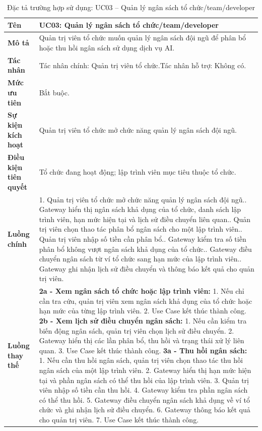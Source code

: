 \begin{longtable}{|L{4.2cm}|L{9.5cm}|}
\caption[Đặc tả UC03]{Đặc tả trường hợp sử dụng: UC03 -- Quản lý ngân sách tổ chức/team/developer} \\\hline
\textbf{Tên} & UC03: Quản lý ngân sách tổ chức/team/developer \\\hline
\textbf{Mô tả} & Quản trị viên tổ chức muốn quản lý ngân sách đội ngũ để phân bổ hoặc thu hồi ngân sách sử dụng dịch vụ AI.\\\hline
\textbf{Tác nhân} & Tác nhân chính: Quản trị viên tổ chức.\newline Tác nhân hỗ trợ: Không có.\\\hline
\textbf{Mức ưu tiên} & Bắt buộc.\\\hline
\textbf{Sự kiện kích hoạt} & Quản trị viên tổ chức mở chức năng quản lý ngân sách đội ngũ.\\\hline
\textbf{Điều kiện tiên quyết} & Tổ chức đang hoạt động; lập trình viên mục tiêu thuộc tổ chức.\\\hline
\textbf{Luồng chính} &
1. Quản trị viên tổ chức mở chức năng quản lý ngân sách đội ngũ.. Gateway hiển thị ngân sách khả dụng của tổ chức, danh sách lập trình viên, hạn mức hiện tại và lịch sử điều chuyển liên quan.. Quản trị viên chọn thao tác phân bổ ngân sách cho một lập trình viên.. Quản trị viên nhập số tiền cần phân bổ.. Gateway kiểm tra số tiền phân bổ không vượt ngân sách khả dụng của tổ chức.. Gateway điều chuyển ngân sách từ ví tổ chức sang hạn mức của lập trình viên.. Gateway ghi nhận lịch sử điều chuyển và thông báo kết quả cho quản trị viên.\\\hline
\textbf{Luồng thay thế} &
\textbf{2a - Xem ngân sách tổ chức hoặc lập trình viên:} 1. Nếu chỉ cần tra cứu, quản trị viên xem ngân sách khả dụng của tổ chức hoặc hạn mức của từng lập trình viên. 2. Use Case kết thúc thành công.\newline
\textbf{2b - Xem lịch sử điều chuyển ngân sách:} 1. Nếu cần kiểm tra biến động ngân sách, quản trị viên chọn lịch sử điều chuyển. 2. Gateway hiển thị các lần phân bổ, thu hồi và trạng thái xử lý liên quan. 3. Use Case kết thúc thành công.\newline
\textbf{3a - Thu hồi ngân sách:} 1. Nếu cần thu hồi ngân sách, quản trị viên chọn thao tác thu hồi ngân sách của một lập trình viên. 2. Gateway hiển thị hạn mức hiện tại và phần ngân sách có thể thu hồi của lập trình viên. 3. Quản trị viên nhập số tiền cần thu hồi. 4. Gateway kiểm tra phần ngân sách có thể thu hồi. 5. Gateway điều chuyển ngân sách khả dụng về ví tổ chức và ghi nhận lịch sử điều chuyển. 6. Gateway thông báo kết quả cho quản trị viên. 7. Use Case kết thúc thành công.\newline

\end{longtable}
